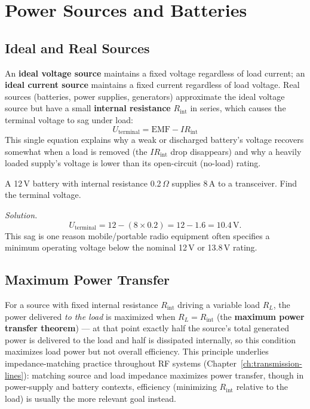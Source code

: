 \chapter{Power Sources and Batteries}
\label{ch:power-sources}

\section{Ideal and Real Sources}

An \textbf{ideal voltage source} maintains a fixed voltage regardless of
load current; an \textbf{ideal current source} maintains a fixed current
regardless of load voltage. Real sources (batteries, power supplies,
generators) approximate the ideal voltage source but have a small
\textbf{internal resistance} $R_{\text{int}}$ in series, which causes the
terminal voltage to sag under load:
\[
\boxed{U_{\text{terminal}} = \text{EMF} - I R_{\text{int}}}
\]
This single equation explains why a weak or discharged battery's voltage
recovers somewhat when a load is removed (the $IR_{\text{int}}$ drop
disappears) and why a heavily loaded supply's voltage is lower than its
open-circuit (no-load) rating.

\begin{examplebox}
A 12\,V battery with internal resistance 0.2\,$\Omega$ supplies 8\,A to a
transceiver. Find the terminal voltage.

\emph{Solution.}
\[
U_{\text{terminal}} = 12 - (8 \times 0.2) = 12 - 1.6 = 10.4\,\text{V}.
\]
This sag is one reason mobile/portable radio equipment often specifies a
minimum operating voltage below the nominal 12\,V or 13.8\,V rating.
\end{examplebox}

\section{Maximum Power Transfer}

For a source with fixed internal resistance $R_{\text{int}}$ driving a
variable load $R_L$, the power delivered \emph{to the load} is maximized
when $R_L = R_{\text{int}}$ (the \textbf{maximum power transfer
theorem}) --- at that point exactly half the source's total generated
power is delivered to the load and half is dissipated internally, so
this condition maximizes load power but not overall efficiency. This
principle underlies impedance-matching practice throughout RF systems
(Chapter~\ref{ch:transmission-lines}): matching source and load
impedance maximizes power transfer, though in power-supply and battery
contexts, efficiency (minimizing $R_{\text{int}}$ relative to the load)
is usually the more relevant goal instead.

